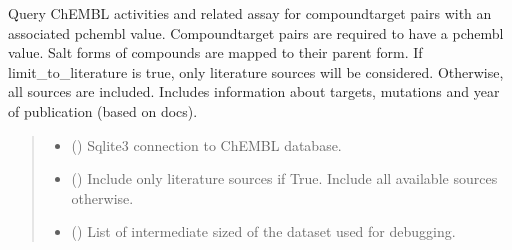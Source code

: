 \documentclass[letterpaper,10pt,english]{sphinxmanual}
\begin{document}
\begin{fulllineitems}
\label{\detokenize{get_activity_ct_pairs:get_activity_ct_pairs.get_compound_target_pairs_with_pchembl}}
\pysigstartsignatures
{}
\pysigstopsignatures
\sphinxAtStartPar
Query ChEMBL activities and related assay for compound\sphinxhyphen{}target pairs with an associated pchembl value.
Compound\sphinxhyphen{}target pairs are required to have a pchembl value.
Salt forms of compounds are mapped to their parent form.
If limit\_to\_literature is true, only literature sources will be considered. Otherwise, all sources are included.
Includes information about targets, mutations and year of publication (based on docs).
\begin{quote}\begin{description}
\begin{itemize}
\item {} 
\sphinxAtStartPar
{} () \textendash{} Sqlite3 connection to ChEMBL database.

\item {} 
\sphinxAtStartPar
{} () \textendash{} Include only literature sources if True. Include all available sources otherwise.

\item {} 
\sphinxAtStartPar
{} (\sphinxstyleliteralemphasis{\sphinxupquote{{[}}}\sphinxstyleliteralemphasis{\sphinxupquote{{[}}}\sphinxstyleliteralemphasis{\sphinxupquote{{]}}}\sphinxstyleliteralemphasis{\sphinxupquote{, }}\sphinxstyleliteralemphasis{\sphinxupquote{{[}}}\sphinxstyleliteralemphasis{\sphinxupquote{{]}}}\sphinxstyleliteralemphasis{\sphinxupquote{{]}}}) \textendash{} List of intermediate sized of the dataset used for debugging.


\end{itemize}
\end{description}
\end{quote}
\end{fulllineitems}
\end{document}
